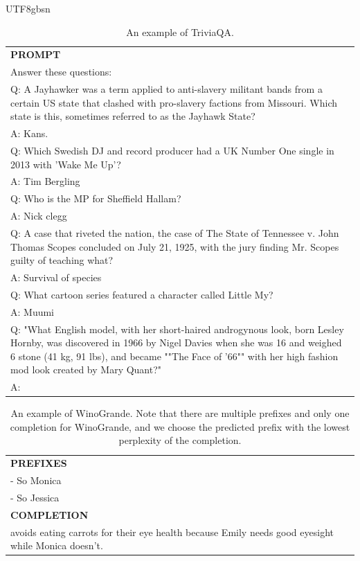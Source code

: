 \documentclass[11pt, a4paper, logo, copyright, nonumbering]{deepseek}
\begin{document}
\begin{CJK*}{UTF8}{gbsn}
\begin{table}[h]
    \centering \small
\begin{tabular}{p{12cm}}
\toprule
\textbf{PROMPT}\\
Answer these questions:\\
Q: A Jayhawker was a term applied to anti-slavery militant bands from a certain US state that clashed with pro-slavery factions from Missouri. Which state is this, sometimes referred to as the Jayhawk State?\\
A: Kans.\\
Q: Which Swedish DJ and record producer had a UK Number One single in 2013 with 'Wake Me Up'?\\
A: Tim Bergling\\
Q: Who is the MP for Sheffield Hallam?\\
A: Nick clegg\\
Q: A case that riveted the nation, the case of The State of Tennessee v. John Thomas Scopes concluded on July 21, 1925, with the jury finding Mr. Scopes guilty of teaching what?\\
A: Survival of species\\
Q: What cartoon series featured a character called Little My?\\
A: Muumi\\
Q: "What English model, with her short-haired androgynous look, born Lesley Hornby, was discovered in 1966 by Nigel Davies when she was 16 and weighed 6 stone (41 kg, 91 lbs), and became ""The Face of '66"" with her high fashion mod look created by Mary Quant?"\\
A:\\
\bottomrule
\end{tabular}
    \caption{\centering An example of TriviaQA.}
    \label{tab:triviaqa_eval_format_example}
\end{table}

\begin{table}[h]
    \centering \small
\begin{tabular}{p{12cm}}
\toprule
\textbf{PREFIXES}\\
- So Monica\\
- So Jessica\\
\midrule
\textbf{COMPLETION}\\
avoids eating carrots for their eye health because Emily needs good eyesight while Monica doesn't.\\
\bottomrule
\end{tabular}
    \caption{An example of WinoGrande. Note that there are multiple prefixes and only one completion for WinoGrande, and we choose the predicted prefix with the lowest perplexity of the completion.}
    \label{tab:winogrande_eval_format_example}
\end{table}

\setcounter{figure}{0}
\makeatletter 
\renewcommand{\thefigure}{A\@arabic\c@figure}
\makeatother

\setcounter{table}{0}
\makeatletter 
\renewcommand{\thetable}{A\@arabic\c@table}
\makeatother

\end{CJK*}
\end{document}

